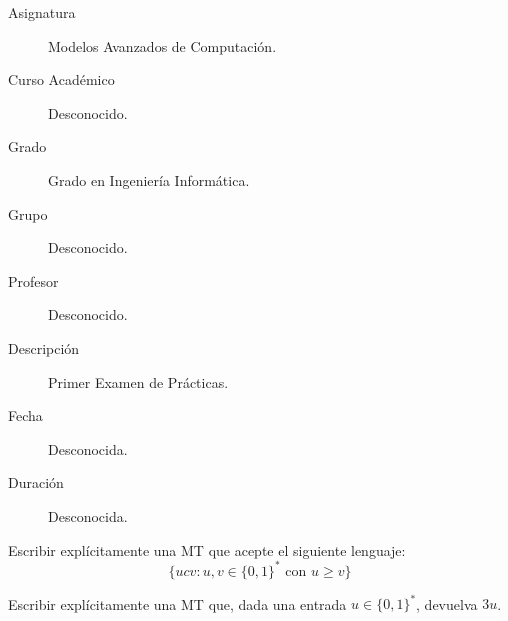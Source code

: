 \documentclass[12pt]{article}
\begin{document}

    
    

    \newpage

    \begin{description}
        \item[Asignatura] Modelos Avanzados de Computación.
        \item[Curso Académico] Desconocido.
        \item[Grado] Grado en Ingeniería Informática.
        \item[Grupo] Desconocido.
        \item[Profesor] Desconocido.
        \item[Descripción] Primer Examen de Prácticas.
        \item[Fecha] Desconocida.
        \item[Duración] Desconocida.
    \end{description}
    \newpage



    \begin{ejercicio}
        Escribir explícitamente una MT que acepte el siguiente lenguaje:
        $$\{ucv : u,v \in \{0,1\}^* \text{ con } u \geq v\}$$
    \end{ejercicio}

    \begin{ejercicio}
        Escribir explícitamente una MT que, dada una entrada $u \in \{0,1\}^{*}$,
        devuelva $3u$.
    \end{ejercicio}

    \newpage

    \setcounter{ejercicio}{0}
\end{document}

